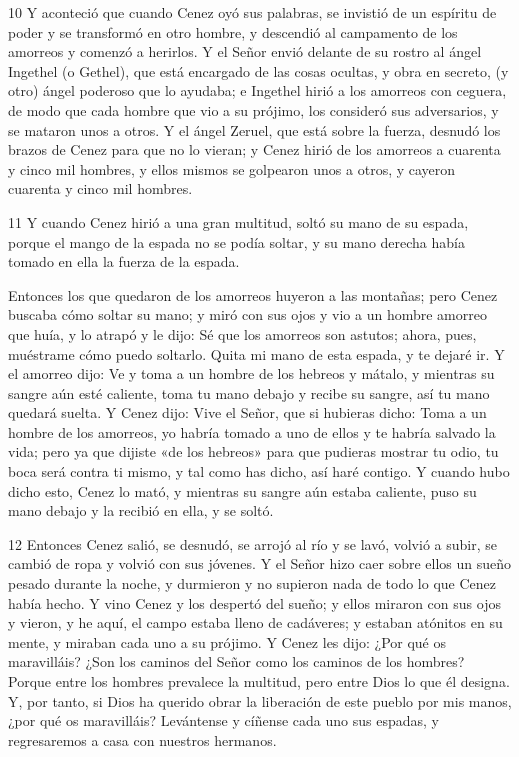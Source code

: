 \par 10 Y aconteció que cuando Cenez oyó sus palabras, se invistió de un espíritu de poder y se transformó en otro hombre, y descendió al campamento de los amorreos y comenzó a herirlos. Y el Señor envió delante de su rostro al ángel Ingethel (o Gethel), que está encargado de las cosas ocultas, y obra en secreto, (y otro) ángel poderoso que lo ayudaba; e Ingethel hirió a los amorreos con ceguera, de modo que cada hombre que vio a su prójimo, los consideró sus adversarios, y se mataron unos a otros. Y el ángel Zeruel, que está sobre la fuerza, desnudó los brazos de Cenez para que no lo vieran; y Cenez hirió de los amorreos a cuarenta y cinco mil hombres, y ellos mismos se golpearon unos a otros, y cayeron cuarenta y cinco mil hombres.

\par 11 Y cuando Cenez hirió a una gran multitud, soltó su mano de su espada, porque el mango de la espada no se podía soltar, y su mano derecha había tomado en ella la fuerza de la espada.

\par Entonces los que quedaron de los amorreos huyeron a las montañas; pero Cenez buscaba cómo soltar su mano; y miró con sus ojos y vio a un hombre amorreo que huía, y lo atrapó y le dijo: Sé que los amorreos son astutos; ahora, pues, muéstrame cómo puedo soltarlo. Quita mi mano de esta espada, y te dejaré ir. Y el amorreo dijo: Ve y toma a un hombre de los hebreos y mátalo, y mientras su sangre aún esté caliente, toma tu mano debajo y recibe su sangre, así tu mano quedará suelta. Y Cenez dijo: Vive el Señor, que si hubieras dicho: Toma a un hombre de los amorreos, yo habría tomado a uno de ellos y te habría salvado la vida; pero ya que dijiste «de los hebreos» para que pudieras mostrar tu odio, tu boca será contra ti mismo, y tal como has dicho, así haré contigo. Y cuando hubo dicho esto, Cenez lo mató, y mientras su sangre aún estaba caliente, puso su mano debajo y la recibió en ella, y se soltó.

\par 12 Entonces Cenez salió, se desnudó, se arrojó al río y se lavó, volvió a subir, se cambió de ropa y volvió con sus jóvenes. Y el Señor hizo caer sobre ellos un sueño pesado durante la noche, y durmieron y no supieron nada de todo lo que Cenez había hecho. Y vino Cenez y los despertó del sueño; y ellos miraron con sus ojos y vieron, y he aquí, el campo estaba lleno de cadáveres; y estaban atónitos en su mente, y miraban cada uno a su prójimo. Y Cenez les dijo: ¿Por qué os maravilláis? ¿Son los caminos del Señor como los caminos de los hombres? Porque entre los hombres prevalece la multitud, pero entre Dios lo que él designa. Y, por tanto, si Dios ha querido obrar la liberación de este pueblo por mis manos, ¿por qué os maravilláis? Levántense y cíñense cada uno sus espadas, y regresaremos a casa con nuestros hermanos.

